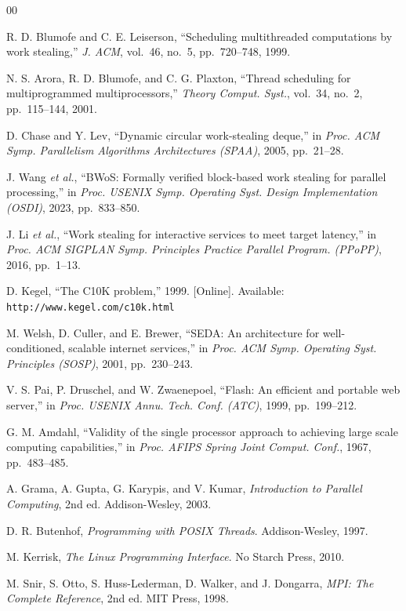 \documentclass[conference]{IEEEtran}
\begin{document}
\begin{thebibliography}{00}

 R. D. Blumofe and C. E. Leiserson, ``Scheduling multithreaded computations by work stealing,'' \textit{J. ACM}, vol.~46, no.~5, pp.~720--748, 1999.

 N. S. Arora, R. D. Blumofe, and C. G. Plaxton, ``Thread scheduling for multiprogrammed multiprocessors,'' \textit{Theory Comput. Syst.}, vol.~34, no.~2, pp.~115--144, 2001.

 D. Chase and Y. Lev, ``Dynamic circular work-stealing deque,'' in \textit{Proc. ACM Symp. Parallelism Algorithms Architectures (SPAA)}, 2005, pp.~21--28.

 J. Wang \textit{et al.}, ``BWoS: Formally verified block-based work stealing for parallel processing,'' in \textit{Proc. USENIX Symp. Operating Syst. Design Implementation (OSDI)}, 2023, pp.~833--850.

 J. Li \textit{et al.}, ``Work stealing for interactive services to meet target latency,'' in \textit{Proc. ACM SIGPLAN Symp. Principles Practice Parallel Program. (PPoPP)}, 2016, pp.~1--13.

 D. Kegel, ``The C10K problem,'' 1999. [Online]. Available: \texttt{http://www.kegel.com/c10k.html}

 M. Welsh, D. Culler, and E. Brewer, ``SEDA: An architecture for well-conditioned, scalable internet services,'' in \textit{Proc. ACM Symp. Operating Syst. Principles (SOSP)}, 2001, pp.~230--243.

 V. S. Pai, P. Druschel, and W. Zwaenepoel, ``Flash: An efficient and portable web server,'' in \textit{Proc. USENIX Annu. Tech. Conf. (ATC)}, 1999, pp.~199--212.

 G. M. Amdahl, ``Validity of the single processor approach to achieving large scale computing capabilities,'' in \textit{Proc. AFIPS Spring Joint Comput. Conf.}, 1967, pp.~483--485.

 A. Grama, A. Gupta, G. Karypis, and V. Kumar, \textit{Introduction to Parallel Computing}, 2nd ed. Addison-Wesley, 2003.

 D. R. Butenhof, \textit{Programming with POSIX Threads}. Addison-Wesley, 1997.

 M. Kerrisk, \textit{The Linux Programming Interface}. No Starch Press, 2010.

 M. Snir, S. Otto, S. Huss-Lederman, D. Walker, and J. Dongarra, \textit{MPI: The Complete Reference}, 2nd ed. MIT Press, 1998.


\end{thebibliography}
\end{document}
